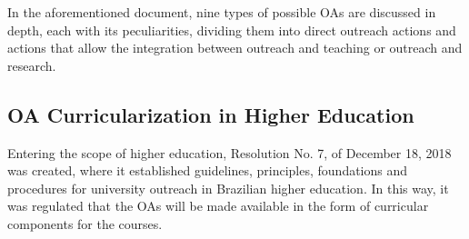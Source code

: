 
In the aforementioned document, nine types of possible \acp{OA} are discussed in depth, each with its peculiarities, dividing them into direct outreach actions and actions that allow the integration between outreach and teaching or outreach and research.



\subsection{\acl{OA} Curricularization in Higher Education}\label{sec:3.1.1}

Entering the scope of higher education, Resolution No. 7, of December 18, 2018 \cite{ministerioSuperiorExtensao} was created, where it established guidelines, principles, foundations and procedures for university outreach in Brazilian higher education.
In this way, it was regulated that the \acp{OA} will be made available in the form of curricular components for the courses.

